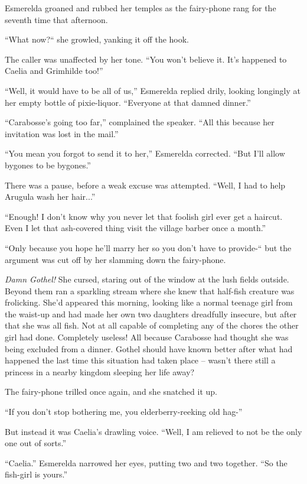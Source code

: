 Esmerelda groaned and rubbed her temples as the fairy-phone rang for the seventh time that afternoon.

“What now?“ she growled, yanking it off the hook.

The caller was unaffected by her tone. “You won’t believe it. It’s happened to Caelia and Grimhilde too!”

“Well, it would have to be all of us,” Esmerelda replied drily, looking longingly at her empty bottle of pixie-liquor. “Everyone at that damned dinner.”

“Carabosse’s going too far,” complained the speaker. “All this because her invitation was lost in the mail.”

“You mean you forgot to send it to her,” Esmerelda corrected. “But I’ll allow bygones to be bygones.”

There was a pause, before a weak excuse was attempted. “Well, I had to help Arugula wash her hair...”

“Enough! I don’t know why you never let that foolish girl ever get a haircut. Even I let that ash-covered thing visit the village barber once a month.”

“Only because you hope he’ll marry her so you don’t have to provide-“ but the argument was cut off by her slamming down the fairy-phone.

\emph{Damn Gothel!} She cursed, staring out of the window at the lush fields outside. Beyond them ran a sparkling stream where she knew that half-fish creature was frolicking. She’d appeared this morning, looking like a normal teenage girl from the waist-up and had made her own two daughters dreadfully insecure, but after that she was all fish. Not at all capable of completing any of the chores the other girl had done. Completely useless! All because Carabosse had thought she was being excluded from a dinner. Gothel should have known better after what had happened the last time this situation had taken place – wasn’t there still a princess in a nearby kingdom sleeping her life away?

The fairy-phone trilled once again, and she snatched it up.

“If you don’t stop bothering me, you elderberry-reeking old hag-”

But instead it was Caelia’s drawling voice. “Well, I am relieved to not be the only one out of sorts.”

“Caelia.” Esmerelda narrowed her eyes, putting two and two together. “So the fish-girl is yours.”


